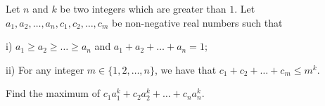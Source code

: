 Let $n$ and $k$ be two integers which are greater than $1$. Let $a_1,a_2,\ldots,a_n,c_1,c_2,\ldots,c_m$ be non-negative real numbers such that

i) $a_1\ge a_2\ge\ldots\ge a_n$ and $a_1+a_2+\ldots+a_n=1$;

ii) For any integer $m\in\{1,2,\ldots,n\}$,  we have that $c_1+c_2+\ldots+c_m\le m^k$.

Find the maximum of $c_1a_1^k+c_2a_2^k+\ldots+c_na_n^k$.